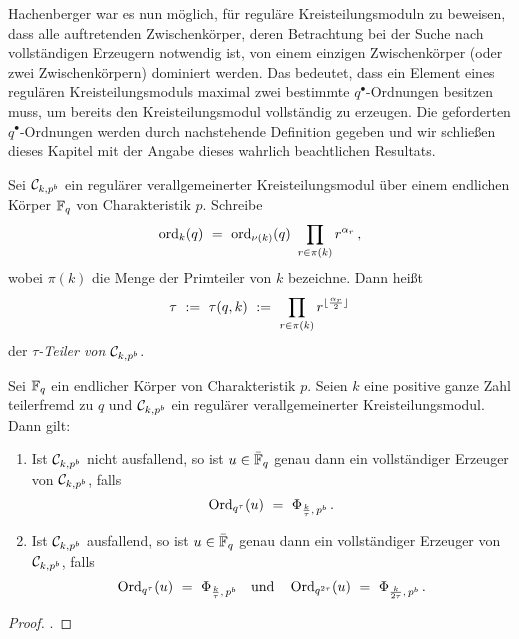 Hachenberger war es nun möglich, für reguläre Kreisteilungsmoduln zu beweisen,
dass alle auftretenden Zwischenkörper, deren Betrachtung bei der Suche nach
vollständigen Erzeugern notwendig ist, von einem einzigen 
Zwischenkörper (oder zwei Zwischenkörpern) dominiert werden. Das bedeutet, dass
ein Element eines regulären Kreisteilungsmoduls maximal zwei bestimmte
$q^\bullet$-Ordnungen besitzen muss, um bereits den Kreisteilungsmodul
vollständig zu erzeugen. Die
geforderten $q^\bullet$-Ordnungen werden durch nachstehende Definition gegeben
und wir schließen dieses Kapitel mit der Angabe dieses wahrlich beachtlichen
Resultats.

\begin{definition}
  \label{def:tau}
  Sei $\mathcal{C}_{k,p^b}$ ein regulärer verallgemeinerter Kreisteilungsmodul über
  einem endlichen Körper $\mathbb{F}_q$ von Charakteristik $p$. Schreibe
  \[ \operatorname{ord}_k(q) \ =\  \operatorname{ord}_{\nu(k)}(q) \ \prod_{r \in \pi(k)} r^{\alpha_r}\,,\]
  wobei $\pi(k)$ die Menge der Primteiler von $k$ bezeichne.
  Dann heißt
  \[ \tau \ :=\  \tau(q,k) \ :=\  \prod_{r\in \pi(k)} 
    r^{\lfloor \frac{\alpha_r}{2}\rfloor}\]
  der \emph{$\tau$-Teiler von $\mathcal{C}_{k,p^b}$}.
\end{definition}

\begin{satz}
  \label{satz:regulare_erweiterungen}
  Sei $\mathbb{F}_q$ ein endlicher Körper von Charakteristik $p$. 
  Seien $k$ eine positive ganze Zahl teilerfremd zu $q$ und 
  $\mathcal{C}_{k,p^b}$ ein regulärer verallgemeinerter Kreisteilungsmodul. Dann gilt:
  \begin{enumerate}
    \item Ist $\mathcal{C}_{k,p^b}$ nicht ausfallend, so ist $u \in \bar {\mathbb{F}}_q$ genau dann
      ein vollständiger Erzeuger von $\mathcal{C}_{k,p^b}$, falls
      \[ \operatorname{Ord}_{q^\tau}(u) \ =\  \Phi_{\frac k \tau,\, p^b} \,.\]
    \item Ist $\mathcal{C}_{k,p^b}$ ausfallend, so ist $u\in \bar {\mathbb{F}}_q$ genau dann
      ein vollständiger Erzeuger von $\mathcal{C}_{k,p^b}$, falls
      \[ \operatorname{Ord}_{q^\tau}(u) \ =\  \Phi_{\frac k \tau,\, p^b} \quad
        \text{und}\quad 
        \operatorname{Ord}_{q^{2\tau}}(u) \ =\  \Phi_{\frac{k}{2\tau},\, p^b}\,.\]
  \end{enumerate}
\end{satz}
\begin{proof}
  \autocite[Theorem 20.3]{hachenberger1997finite}.
\end{proof}
